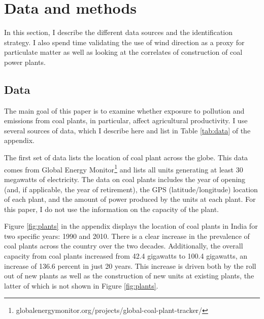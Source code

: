 \documentclass[
]{article}
\begin{document}
\hypertarget{data-and-methods}{%
\section{Data and methods}\label{data-and-methods}}

\label{data}

In this section, I describe the different data sources and the identification strategy. I also spend time validating the use of wind direction as a proxy for particulate matter as well as looking at the correlates of construction of coal power plants.

\hypertarget{data}{%
\subsection{Data}\label{data}}

\label{data2}

The main goal of this paper is to examine whether exposure to pollution and emissions from coal plants, in particular, affect agricultural productivity. I use several sources of data, which I describe here and list in Table \ref{tab:data} of the appendix.

The first set of data lists the location of coal plant across the globe. This data comes from Global Energy Monitor\footnote{globalenergymonitor.org/projects/global-coal-plant-tracker/} and lists all units generating at least 30 megawatts of electricity. The data on coal plants includes the year of opening (and, if applicable, the year of retirement), the GPS (latitude/longitude) location of each plant, and the amount of power produced by the units at each plant. For this paper, I do not use the information on the capacity of the plant.

Figure \ref{fig:plants} in the appendix displays the location of coal plants in India for two specific years: 1990 and 2010. There is a clear increase in the prevalence of coal plants across the country over the two decades. Additionally, the overall capacity from coal plants increased from 42.4 gigawatts to 100.4 gigawatts, an increase of 136.6 percent in just 20 years. This increase is driven both by the roll out of new plants as well as the construction of new units at existing plants, the latter of which is not shown in Figure \ref{fig:plants}.
\end{document}
